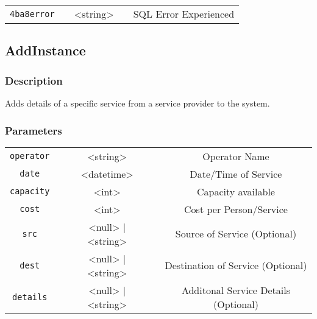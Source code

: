 \documentclass[a4paper,12pt]{article}
\begin{document}
\begin{tabular}{ccccc}
\verb!4ba8error! & \vspace{15mm} & <string> & \vspace{15mm} & SQL Error Experienced \\
\end{tabular}


\subsection{AddInstance}

\subsubsection{Description}

Adds details of a specific service from a service provider to the
system.  

\subsubsection{Parameters}

\begin{tabular}{ccccc}
\verb!operator! & \vspace{15mm} & <string> 	& \vspace{15mm} & Operator Name \\
\verb!date! 	 & \vspace{15mm} & <datetime> & \vspace{15mm} & Date/Time of Service\\
\verb!capacity! & \vspace{15mm} & <int> 		& \vspace{15mm} & Capacity available \\
\verb!cost! 	 & \vspace{15mm} & <int> 		& \vspace{15mm} & Cost per Person/Service \\
\verb!src! 		 & \vspace{15mm} & <null> | <string> & \vspace{15mm} & Source of Service (Optional) \\
\verb!dest! 	 & \vspace{15mm} & <null> | <string> & \vspace{15mm} & Destination of Service (Optional) \\
\verb!details!  & \vspace{15mm} & <null> | <string> & \vspace{15mm} & Additonal Service Details (Optional) \\
\end{tabular}
\end{document}
